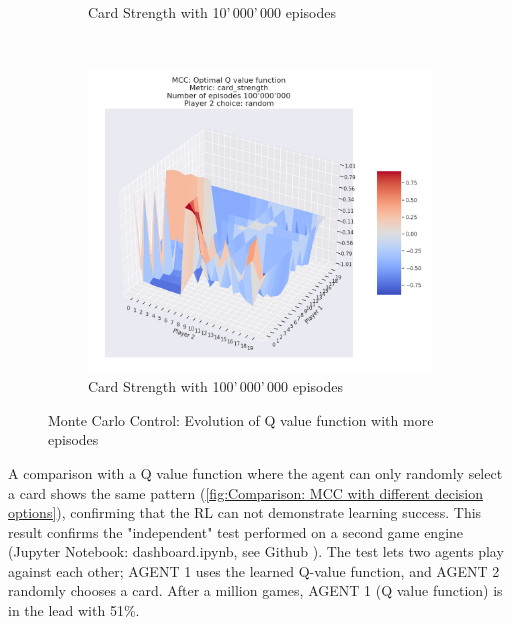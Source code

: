 \begin{figure}[ht!]
\begin{subfigure}{0.5\textwidth}
        \caption[Card Strength with 10'\,000'\,000 episodes]{Card Strength with 10'\,000'\,000 episodes}
        \label{fig:mcc10}
    \end{subfigure} \\
    \begin{subfigure}{0.5\textwidth}
        \includegraphics[width=1\linewidth]{Figures/mcc_card_strength_100000000_random}
        \caption[Card Strength with 100'\,000'\,000 episodes]{Card Strength with 100'\,000'\,000 episodes}
        \label{fig:mcc100}
    \end{subfigure}
\caption{Monte Carlo Control: Evolution of Q value function with more episodes}
\label{fig:Monte Carlo Control: Evolution of Q value function with more episodes}
\end{figure}


A comparison with a Q value function where the agent can only randomly select a card shows the same pattern (\ref{fig:Comparison: MCC with different decision options}), confirming that the RL can not demonstrate learning success. This result confirms the "independent" test performed on a second game engine (Jupyter Notebook: dashboard.ipynb, see Github \cite{code}). The test lets two agents play against each other; AGENT 1 uses the learned Q-value function, and AGENT 2 randomly chooses a card. After a million games, AGENT 1 (Q value function) is in the lead with 51\%.


